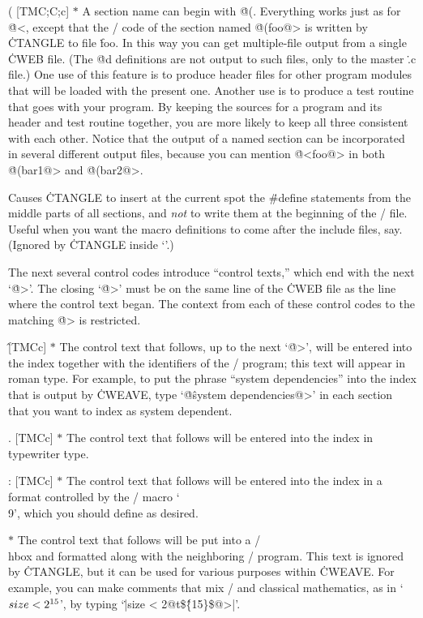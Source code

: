 \@( [TM\to C;\;C;\;c] $*$ A section name can begin with \.{@(}.
Everything works just as for \.{@<}, except that the \CEE/ code
of the section named \.{@(foo@>} is written by \.{CTANGLE}
to file \.{foo}. In this way you can get multiple-file output from
a single \.{CWEB} file. (The \.{@d} definitions are not output
to such files, only to the master \.{.c} file.) One use of this feature
is to produce header files for other program modules that will be loaded
with the present one. Another use is to produce a test routine that
goes with your program. By keeping the sources for a program and its
header and test routine together, you are more likely to keep
all three consistent with each other. Notice that the output of a named
section can be incorporated in several different output files, because
you can mention \.{@<foo@>} in both \.{@(bar1@>} and \.{@(bar2@>}.

\@h [Cc] Causes \.{CTANGLE}
to insert at the current spot the \.{\#define} statements
from the middle parts of all sections,
and {\it not\/} to write them at the beginning of the \CEE/ file.
Useful when you want the macro definitions to come after the include files,
say. (Ignored by \.{CTANGLE} inside `\pb'.)

\subsec
The next several control codes introduce ``control
texts,'' which end with the next `\.{@>}'.  The closing `\.{@>}' must be on
the same line of the \.{CWEB} file as the line where the control text began.
The context from each of these control codes to the matching \.{@>} is
restricted.

\@\^ [TMCc] $*$ The control text that follows, up to the next
`\.{@>}', will be entered into the index together with the identifiers of
the \CEE/ program; this text will appear in roman type. For example, to
put the phrase ``system dependencies'' into the index that is output by
\.{CWEAVE}, type
`\.{@\^system dependencies@>}' in each section
that you want to index as system dependent.

\@. [TMCc] $*$ The control text that follows will be entered into the index
in \.{typewriter} \.{type}.

\@: [TMCc] $*$ The control text that follows will be entered into the index
in a format controlled by the \TEX/ macro `\.{\\9}', which you
should define as desired.

\@t [MCc] $*$ The control text that follows will
be put into a \TEX/ \.{\\hbox} and formatted along with the neighboring
\CEE/ program. This text is ignored by \.{CTANGLE}, but it can be used
for various purposes within \.{CWEAVE}. For example, you can make comments
that mix \CEE/ and classical mathematics, as in `$\\{size}<2^{15}$', by
typing `\.{|size < 2@t\$\^\{15\}\$@>|}'.

